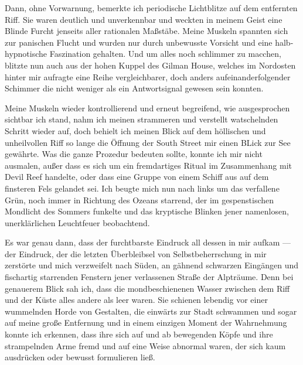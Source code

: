 Dann, ohne Vorwarnung, bemerkte ich periodische Lichtblitze auf dem entfernten Riff. Sie waren deutlich und unverkennbar und weckten in meinem Geist eine Blinde Furcht jenseits aller rationalen Maßstäbe. Meine Muskeln spannten sich zur panischen Flucht und wurden nur durch unbewusste Vorsicht und eine halb-hypnotische Faszination gehalten. Und um alles noch schlimmer zu macchen, blitzte nun auch aus der hohen Kuppel des Gilman House, welches im Nordosten hinter mir aufragte eine Reihe vergleichbarer, doch anders aufeinanderfolgender Schimmer die nicht weniger als ein Antwortsignal gewesen sein konnten.

Meine Muskeln wieder kontrollierend und erneut begreifend, wie ausgesprochen sichtbar ich stand, nahm ich meinen strammeren und verstellt watschelnden Schritt wieder auf, doch behielt ich meinen Blick auf dem höllischen und unheilvollen Riff so lange die Öffnung der South Street mir einen BLick zur See gewährte. Was die ganze Prozedur bedeuten sollte, konnte ich mir nicht ausmalen, außer dass es sich um ein fremdartiges Ritual im Zusammenhang mit Devil Reef handelte, oder dass eine Gruppe von einem Schiff aus auf dem finsteren Fels gelandet sei. Ich beugte mich nun nach links um das verfallene Grün, noch immer in Richtung des Ozeans starrend, der im gespenstischen Mondlicht des Sommers funkelte und das kryptische Blinken jener namenlosen, unerklärlichen Leuchtfeuer beobachtend.

Es war genau dann, dass der furchtbarste Eindruck all dessen in mir aufkam --- der Eindruck, der die letzten Überbleibsel von Selbstbeherrschung in mir zerstörte und mich verzweifelt nach Süden, an gähnend schwarzen Eingängen und fischartig starrenden Fenstern jener verlassenen Straße der Alpträume. Denn bei genauerem Blick sah ich, dass die mondbeschienenen Wasser zwischen dem Riff und der Küste alles andere als leer waren. Sie schienen lebendig vor einer wummelnden Horde von Gestalten, die einwärts zur Stadt schwammen und sogar auf meine große Entfernung und in einem einzigen Moment der Wahrnehmung konnte ich erkennen, dass ihre sich auf und ab bewegenden Köpfe und ihre strampelnden Arme fremd und auf eine Weise abnormal waren, der sich kaum ausdrücken oder bewusst formulieren ließ.
